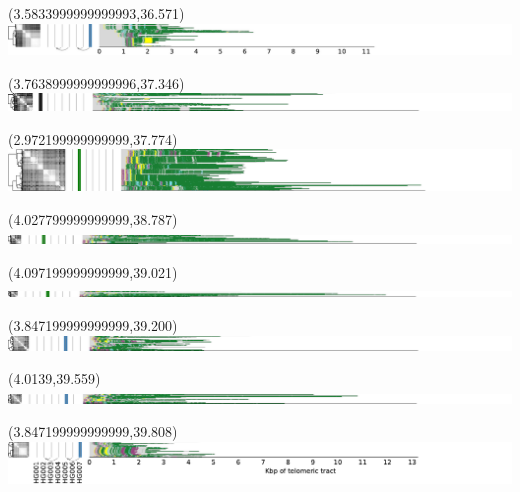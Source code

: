\documentclass{article}
\begin{document}
\begin{textblock}{13}(3.5833999999999993,36.571)\includegraphics{latex/figures/haplotypes-constrained/chr22-HG007.pdf}\end{textblock}
\begin{textblock}{13}(3.7638999999999996,37.346)\includegraphics{latex/figures/haplotypes-constrained/chrX-HG001.pdf}\end{textblock}
\begin{textblock}{13}(2.972199999999999,37.774)\includegraphics{latex/figures/haplotypes-constrained/chrX-HG002.pdf}\end{textblock}
\begin{textblock}{13}(4.027799999999999,38.787)\includegraphics{latex/figures/haplotypes-constrained/chrX-HG003.pdf}\end{textblock}
\begin{textblock}{13}(4.097199999999999,39.021)\includegraphics{latex/figures/haplotypes-constrained/chrX-HG004.pdf}\end{textblock}
\begin{textblock}{13}(3.847199999999999,39.200)\includegraphics{latex/figures/haplotypes-constrained/chrX-HG005.pdf}\end{textblock}
\begin{textblock}{13}(4.0139,39.559)\includegraphics{latex/figures/haplotypes-constrained/chrX-HG006.pdf}\end{textblock}
\begin{textblock}{13}(3.847199999999999,39.808)\includegraphics{latex/figures/haplotypes-constrained/chrX-HG007.pdf}\end{textblock}
\end{document}
